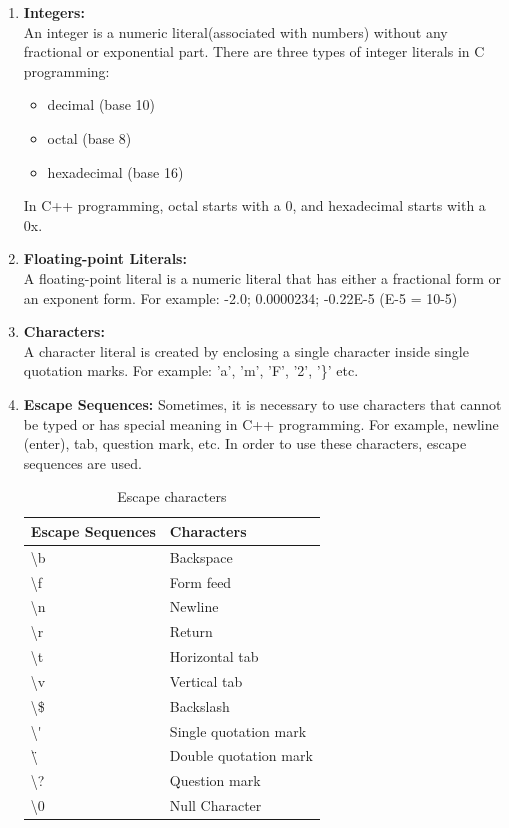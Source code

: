 \documentclass{book}
\begin{document}
\begin{enumerate}
	\item \textbf{Integers:} \\
	An integer is a numeric literal(associated with numbers) without any fractional or exponential part. There are three types of integer literals in C programming:
	\begin{itemize}
		\item decimal (base 10)
\item octal (base 8)
\item hexadecimal (base 16)
	\end{itemize}
	In C++ programming, octal starts with a 0, and hexadecimal starts with a 0x.

\item \textbf{Floating-point Literals:} \\
A floating-point literal is a numeric literal that has either a fractional form or an exponent form. For example:
-2.0; 0.0000234; -0.22E-5 (E-5 = 10-5)
\item \textbf{Characters:} \\
A character literal is created by enclosing a single character inside single quotation marks. For example: 'a', 'm', 'F', '2', '\}' etc.
\item \textbf{Escape Sequences: }
Sometimes, it is necessary to use characters that cannot be typed or has special meaning in C++ programming. For example, newline (enter), tab, question mark, etc. In order to use these characters, escape sequences are used.

\begin{table}[h]
\centering 
\begin{tabular}{ll} \hline 
Escape Sequences	& Characters \\ \hline 
\textbackslash b	& Backspace \\
\textbackslash f	& Form feed \\
\textbackslash n	& Newline \\
\textbackslash r	& Return \\
\textbackslash t	& Horizontal tab \\
\textbackslash v	& Vertical tab \\
\textbackslash \$	& Backslash \\
\textbackslash \'	& Single quotation mark \\
\textbackslash \"	& Double quotation mark \\
\textbackslash ?	& Question mark \\
\textbackslash 0	& Null Character \\ \hline 
\end{tabular}
\caption{Escape characters}
\label{}
\end{table}



\end{enumerate}
\end{document}
